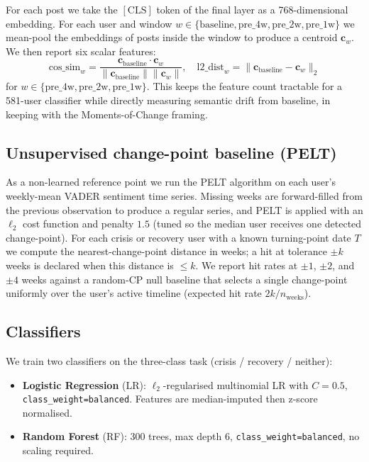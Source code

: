 \documentclass[11pt]{article}
\begin{document}
For each post we take the $[\text{CLS}]$ token of the final layer as a
768-dimensional embedding.
For each user and window $w \in \{\text{baseline}, \text{pre\_4w},
\text{pre\_2w}, \text{pre\_1w}\}$ we mean-pool the embeddings of posts
inside the window to produce a centroid $\mathbf{c}_w$.
We then report six scalar features:
\[
  \text{cos\_sim}_w = \frac{\mathbf{c}_{\text{baseline}} \cdot \mathbf{c}_w}
                          {\lVert\mathbf{c}_{\text{baseline}}\rVert \lVert\mathbf{c}_w\rVert},
  \quad
  \text{l2\_dist}_w = \lVert\mathbf{c}_{\text{baseline}} - \mathbf{c}_w\rVert_2
\]
for $w \in \{\text{pre\_4w}, \text{pre\_2w}, \text{pre\_1w}\}$.
This keeps the feature count tractable for a 581-user classifier while
directly measuring semantic drift from baseline, in keeping with the
Moments-of-Change framing.

\subsection{Unsupervised change-point baseline (PELT)}
\label{sec:pelt}
As a non-learned reference point we run the PELT algorithm
\citep{vandenburg2020survey} on each user's weekly-mean VADER sentiment
time series.
Missing weeks are forward-filled from the previous observation to
produce a regular series, and PELT is applied with an $\ell_2$ cost
function and penalty $1.5$ (tuned so the median user receives one
detected change-point).
For each crisis or recovery user with a known turning-point date $T$
we compute the nearest-change-point distance in weeks; a hit at
tolerance $\pm k$ weeks is declared when this distance is
$\leq k$.
We report hit rates at $\pm 1$, $\pm 2$, and $\pm 4$ weeks against a
random-CP null baseline that selects a single change-point uniformly
over the user's active timeline (expected hit rate
$2k / n_{\text{weeks}}$).

\subsection{Classifiers}
We train two classifiers on the three-class task (crisis / recovery /
neither):

\begin{itemize}
  \item \textbf{Logistic Regression} (LR): $\ell_2$-regularised
        multinomial LR with $C{=}0.5$, \texttt{class\_weight=balanced}.
        Features are median-imputed then z-score normalised.
  \item \textbf{Random Forest} (RF): 300 trees, max depth 6,
        \texttt{class\_weight=balanced}, no scaling required.
\end{itemize}
\end{document}
